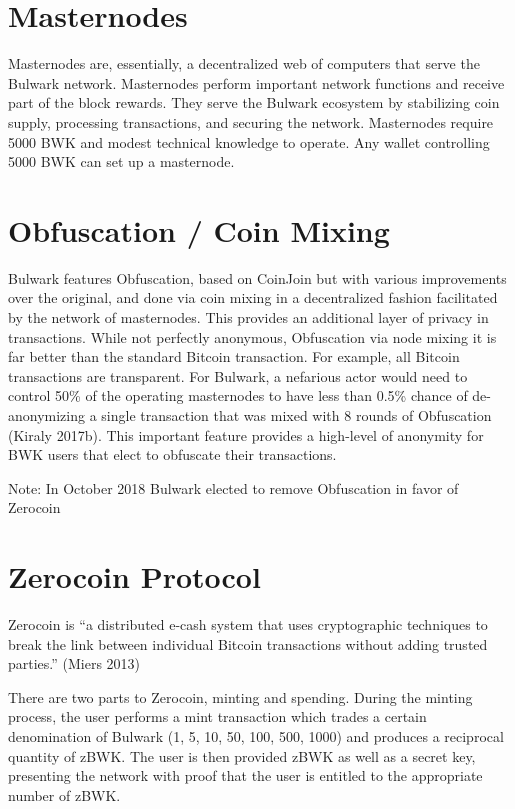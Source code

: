 \documentclass[11pt,a4paperpaper,]{report}
\begin{document}
\section{Masternodes}\label{masternodes}

Masternodes are, essentially, a decentralized web of computers that
serve the Bulwark network. Masternodes perform important network
functions and receive part of the block rewards. They serve the Bulwark
ecosystem by stabilizing coin supply, processing transactions, and
securing the network. Masternodes require 5000 BWK and modest technical
knowledge to operate. Any wallet controlling 5000 BWK can set up a
masternode.

\section{Obfuscation / Coin Mixing}\label{obfuscation-coin-mixing}

Bulwark features Obfuscation, based on CoinJoin but with various
improvements over the original, and done via coin mixing in a
decentralized fashion facilitated by the network of masternodes. This
provides an additional layer of privacy in transactions. While not
perfectly anonymous, Obfuscation via node mixing it is far better than
the standard Bitcoin transaction. For example, all Bitcoin transactions
are transparent. For Bulwark, a nefarious actor would need to control
50\% of the operating masternodes to have less than 0.5\% chance of
de-anonymizing a single transaction that was mixed with 8 rounds of
Obfuscation (Kiraly 2017b). This important feature provides a high-level
of anonymity for BWK users that elect to obfuscate their transactions.

Note: In October 2018 Bulwark elected to remove Obfuscation in favor of
Zerocoin

\section{Zerocoin Protocol}\label{zerocoin-protocol}

Zerocoin is ``a distributed e-cash system that uses cryptographic
techniques to break the link between individual Bitcoin transactions
without adding trusted parties.'' (Miers 2013)

There are two parts to Zerocoin, minting and spending. During the
minting process, the user performs a mint transaction which trades a
certain denomination of Bulwark (1, 5, 10, 50, 100, 500, 1000) and
produces a reciprocal quantity of zBWK. The user is then provided zBWK
as well as a secret key, presenting the network with proof that the user
is entitled to the appropriate number of zBWK.
\end{document}
